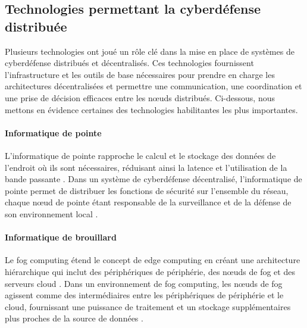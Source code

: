 


\subsection{Technologies permettant la cyberdéfense distribuée}

Plusieurs technologies ont joué un rôle clé dans la mise en place de systèmes de cyberdéfense distribués et décentralisés. Ces technologies fournissent l'infrastructure et les outils de base nécessaires pour prendre en charge les architectures décentralisées et permettre une communication, une coordination et une prise de décision efficaces entre les nœuds distribués. Ci-dessous, nous mettons en évidence certaines des technologies habilitantes les plus importantes.

\paragraph{Informatique de pointe}

L'informatique de pointe rapproche le calcul et le stockage des données de l'endroit où ils sont nécessaires, réduisant ainsi la latence et l'utilisation de la bande passante \cite{Shi2016}. Dans un système de cyberdéfense décentralisé, l'informatique de pointe permet de distribuer les fonctions de sécurité sur l'ensemble du réseau, chaque nœud de pointe étant responsable de la surveillance et de la défense de son environnement local \cite{Roman2018}.

\paragraph{Informatique de brouillard}

Le fog computing étend le concept de edge computing en créant une architecture hiérarchique qui inclut des périphériques de périphérie, des nœuds de fog et des serveurs cloud \cite{Bonomi2012}. Dans un environnement de fog computing, les nœuds de fog agissent comme des intermédiaires entre les périphériques de périphérie et le cloud, fournissant une puissance de traitement et un stockage supplémentaires plus proches de la source de données \cite{Mukherjee2017}.

